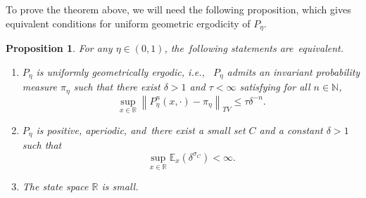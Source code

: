 \documentclass[11pt]{elsarticle}
\newtheorem{proposition}{Proposition}[section]
\def\leq{\leqslant}
\def\E{\mathbb{E}}
\def\N{\mathbb{N}}
\def\R{\mathbb{R}}
\begin{document}
 To prove the theorem above, we will need the following proposition, which gives equivalent conditions for uniform geometric ergodicity of $P_\eta$.
\begin{proposition}\label{uniformGE}
	For any $\eta\in(0,1)$, the~following statements are~equivalent.
	\begin{enumerate}
		\item [(1)] $P_{\eta}$ is uniformly geometrically ergodic, i.e.,~ $P_\eta$ admits an invariant probability measure $\pi_\eta$ such that there exist $\delta>1$ and $\tau<\infty$ satisfying for all $n\in\N$,
		\begin{equation}\label{ine-uniformGE}
			\sup_{x\in \R}\left\|P_{\eta}^n(x,\cdot)-\pi_{\eta}\right\|_{TV}\leq\tau\delta^{-n}.
		\end{equation}
		\item [(2)] $P_{\eta}$ is positive, aperiodic, and~there exist a small set $C$ and a constant $\delta>1$ such that
		\begin{equation*}
			\sup_{x\in \R}\E_x\left(\delta^{\sigma_C}\right)<\infty.
		\end{equation*}
		\item [(3)] The state space $\R$ is small.
	\end{enumerate}
\end{proposition}
\end{document}
